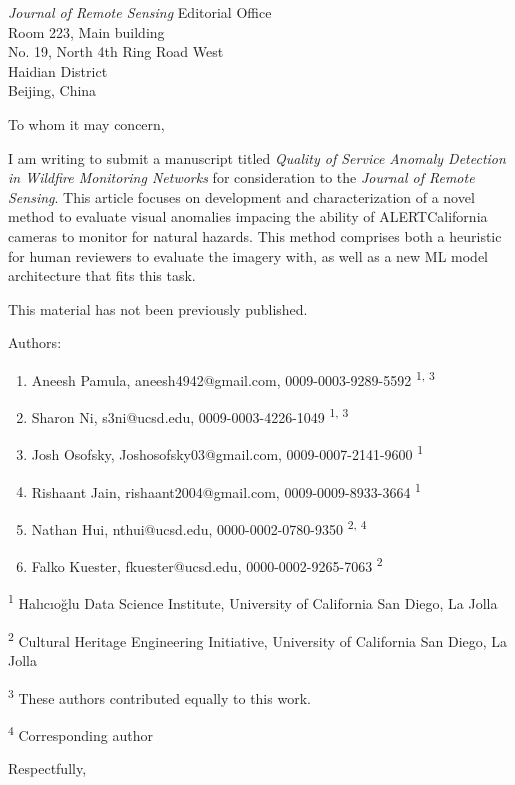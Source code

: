 \documentclass{letter}
\begin{document}
\begin{letter}{\textit{Journal of Remote Sensing} Editorial Office\\Room 223, Main building\\No. 19, North 4th Ring Road West\\Haidian District\\Beijing, China}
\opening{To whom it may concern,}

I am writing to submit a manuscript titled \textit{Quality of Service Anomaly Detection in Wildfire Monitoring Networks} for consideration to the \textit{Journal of Remote Sensing}. This article focuses on development and characterization of a novel method to evaluate visual anomalies impacing the ability of ALERTCalifornia cameras to monitor for natural hazards. This method comprises both a heuristic for human reviewers to evaluate the imagery with, as well as a new ML model architecture that fits this task.

This material has not been previously published.

Authors:
\begin{enumerate}
    \item Aneesh Pamula, aneesh4942@gmail.com, 0009-0003-9289-5592 \textsuperscript{1, 3}
    \item Sharon Ni, s3ni@ucsd.edu, 0009-0003-4226-1049 \textsuperscript{1, 3}
    \item Josh Osofsky, Joshosofsky03@gmail.com, 0009-0007-2141-9600 \textsuperscript{1}
    \item Rishaant Jain, rishaant2004@gmail.com, 0009-0009-8933-3664 \textsuperscript{1}
    \item Nathan Hui, nthui@ucsd.edu, 0000-0002-0780-9350 \textsuperscript{2, 4}
    \item Falko Kuester, fkuester@ucsd.edu, 0000-0002-9265-7063 \textsuperscript{2}
\end{enumerate}

\textsuperscript{1} Halıcıoğlu Data Science Institute, University of California San Diego, La Jolla

\textsuperscript{2} Cultural Heritage Engineering Initiative, University of California San Diego, La Jolla

\textsuperscript{3} These authors contributed equally to this work.

\textsuperscript{4} Corresponding author



\closing{Respectfully,}
\end{letter}
\end{document}
